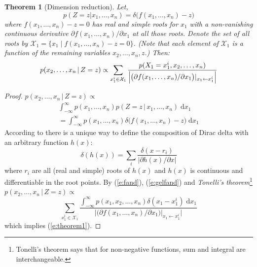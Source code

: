 \documentclass[letterpaper]{article}
\newtheorem{theorem}{Theorem}
\newcommand{\pr}{p}
\newcommand{\dd}{\;\mathrm{d}} %
\begin{document}
\begin{theorem}[Dimension reduction] 
\label{theorem1}
Let, 
\[ 
\pr(Z\!=\!z | x_1, \ldots, x_n) = \delta \big( f(x_1, \ldots, x_n)-z \big)
\]
where $f(x_1, \ldots, x_n) -z = 0$ has real and simple roots for $x_1$ with a non-vanishing continuous derivative
$\partial f(x_1, \ldots, x_n)/\partial x_1$ 
at all those roots.
Denote the set of all roots by 
 $ \mathcal{X}_1 = \{ x_1 \; | \; f(x_1, \ldots, x_n) - z = 0 \} $. 
(Note that each element of $ \mathcal{X}_1 $
 is a function of the remaining variables $ x_2,\dots,x_n,z $.)
 Then:
\begin{equation}\footnotesize
\label{e:theorem1}
p(x_2, \ldots, x_n \,|\, Z=z) \propto 
\sum_{x_1^i \in \mathcal{X}_1} 
\frac{p(X_1=x_1^i, x_2, \ldots, x_n)}
{\Big|\big(\partial f(x_1, \ldots, x_n) / \partial x_1 \big)|_{x_1 \leftarrow x_1^i} \Big|}
\end{equation}
\end{theorem}
\begin{proof} 
{\footnotesize
$p(x_2, \ldots, x_n \,|\, Z=z) \propto$
\begin{multline}
\int_{-\infty}^{\infty}p(x_1, \ldots, x_n)p(Z=z \,|\, x_1, \ldots, x_n) \dd x_1 %
%
\\=\int_{-\infty}^{\infty}p(x_1, \ldots, x_n)
\delta \big( f(x_1, \ldots, x_n) - z \big) \dd x_1 
\label{e:fand}
\end{multline}
}
According to \cite{gel1964generalized}
there is a unique way to define the composition of Dirac delta with 
an arbitrary function $h(x)$:
\begin{equation}
\label{e:gelfand}
\delta(h(x)) = \sum_{i} \frac{\delta(x - r_i)}{|\partial h(x)/\partial x|}
\end{equation}
where $r_i$ are all (real and simple) roots of $h(x)$ and $h(x)$ is continuous and differentiable in the root points. By (\ref{e:fand}), (\ref{e:gelfand})  and 
\emph{Tonelli's theorem}\footnote{Tonelli's theorem says that for non-negative functions, sum and integral are interchangeable.} 
$\pr(x_2, \ldots, x_n \,|\, Z = z) \propto$
\begin{equation*}%
\sum_{x_1^i \in \mathcal{X}_1} 
\frac{\int_{-\infty}^{\infty} p(x_1, x_2, \ldots, x_n)  \delta(x_1 - x_1^i) \dd x_1}
{\Big|\big(\partial f(x_1, \ldots, x_n) / \partial x_1 \big)|_{x_1 \leftarrow x_1^i} \Big|}
\end{equation*}
which implies (\ref{e:theorem1}).
\end{proof}
%
\end{document}
